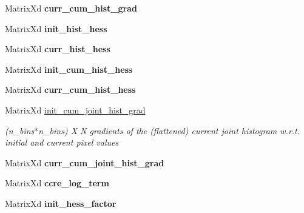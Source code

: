 \begin{DoxyCompactItemize}
\item 
\hypertarget{classCCRE_aa10af4a3b8ed62f174274c4b61f0696a}{Matrix\-Xd {\bfseries curr\-\_\-cum\-\_\-hist\-\_\-grad}}\label{classCCRE_aa10af4a3b8ed62f174274c4b61f0696a}

\item 
\hypertarget{classCCRE_adea408b52017021834f32627ec414d0e}{Matrix\-Xd {\bfseries init\-\_\-hist\-\_\-hess}}\label{classCCRE_adea408b52017021834f32627ec414d0e}

\item 
\hypertarget{classCCRE_a910480195c78dfdf3f4646824a31775e}{Matrix\-Xd {\bfseries curr\-\_\-hist\-\_\-hess}}\label{classCCRE_a910480195c78dfdf3f4646824a31775e}

\item 
\hypertarget{classCCRE_ae31b16cb8fffb353705b76e36c144daf}{Matrix\-Xd {\bfseries init\-\_\-cum\-\_\-hist\-\_\-hess}}\label{classCCRE_ae31b16cb8fffb353705b76e36c144daf}

\item 
\hypertarget{classCCRE_ae465fffc2324511111fd44f22737f046}{Matrix\-Xd {\bfseries curr\-\_\-cum\-\_\-hist\-\_\-hess}}\label{classCCRE_ae465fffc2324511111fd44f22737f046}

\item 
\hypertarget{classCCRE_a2f4c80f752c9a6a1629639259b7f77e1}{Matrix\-Xd \hyperlink{classCCRE_a2f4c80f752c9a6a1629639259b7f77e1}{init\-\_\-cum\-\_\-joint\-\_\-hist\-\_\-grad}}\label{classCCRE_a2f4c80f752c9a6a1629639259b7f77e1}

\begin{DoxyCompactList}\small\item\em (n\-\_\-bins$\ast$n\-\_\-bins) X N gradients of the (flattened) current joint histogram w.\-r.\-t. initial and current pixel values \end{DoxyCompactList}\item 
\hypertarget{classCCRE_a45c2e08608fc6abcae306ced54cc5a74}{Matrix\-Xd {\bfseries curr\-\_\-cum\-\_\-joint\-\_\-hist\-\_\-grad}}\label{classCCRE_a45c2e08608fc6abcae306ced54cc5a74}

\item 
\hypertarget{classCCRE_adb2310a4d06be52d31d1f958e8a829ef}{Matrix\-Xd {\bfseries ccre\-\_\-log\-\_\-term}}\label{classCCRE_adb2310a4d06be52d31d1f958e8a829ef}

\item 
\hypertarget{classCCRE_ae8d74b675f6a0cac46ed821fe760c6ea}{Matrix\-Xd {\bfseries init\-\_\-hess\-\_\-factor}}\label{classCCRE_ae8d74b675f6a0cac46ed821fe760c6ea}


\end{DoxyCompactItemize}
